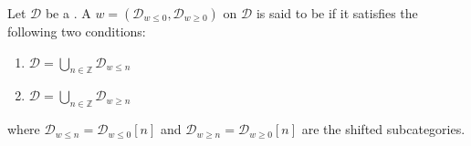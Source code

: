 \begin{definition} \label{definition:bounded_weight_structure_on_a_triangulated_category}
Let $\mathcal{D}$ be a . 
A  $w = (\mathcal{D}_{w \leq 0}, \mathcal{D}_{w \geq 0})$ on $\mathcal{D}$ is said to be  if it satisfies the following two conditions:
\begin{enumerate}
    \item $\mathcal{D} = \bigcup_{n \in \mathbb{Z}} \mathcal{D}_{w \leq n}$
    \item $\mathcal{D} = \bigcup_{n \in \mathbb{Z}} \mathcal{D}_{w \geq n}$
\end{enumerate}
where $\mathcal{D}_{w \leq n} = \mathcal{D}_{w \leq 0}[n]$ and $\mathcal{D}_{w \geq n} = \mathcal{D}_{w \geq 0}[n]$ are the shifted subcategories.
\end{definition}